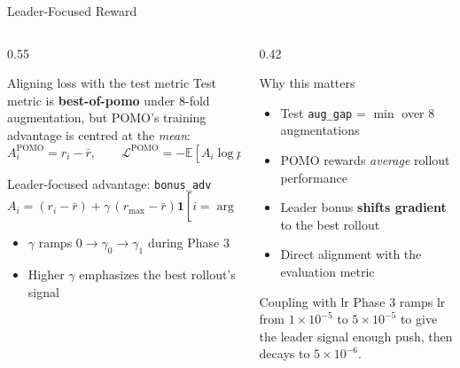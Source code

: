 \documentclass[aspectratio=169,11pt]{beamer}
\newcommand{\tightitems}{%
  \setlength{\itemsep}{1.5pt}%
  \setlength{\parsep}{0pt}%
  \setlength{\topsep}{2pt}%
}
\begin{document}
\begin{frame}[t]{Leader-Focused Reward}
  \small
  \begin{columns}[T,onlytextwidth]
    \begin{column}{0.55\textwidth}
      \begin{block}{Aligning loss with the test metric}
        Test metric is \textbf{best-of-pomo} under 8-fold augmentation,
        but POMO's training advantage is centred at the \emph{mean}:
        \vspace{-0.05cm}
        \[
          A_i^{\text{POMO}} = r_i - \bar{r},
          \qquad
          \mathcal{L}^{\text{POMO}} = -\mathbb{E}\!\left[A_i \log p_i\right]
        \]
      \end{block}
      \begin{block}{Leader-focused advantage: \texttt{bonus\_adv}}
        \vspace{-0.1cm}
        \[
          A_i = (r_i - \bar{r}) + \gamma\,(r_{\max} - \bar{r})
          \mathbf{1}\!\left[i = \arg\max_j r_j\right]
        \]
        \vspace{-0.2cm}
        \begin{itemize}\tightitems
          \item $\gamma$ ramps $0 \!\to\! \gamma_0 \!\to\! \gamma_1$ during Phase 3
          \item Higher $\gamma$ emphasizes the best rollout's signal
        \end{itemize}
      \end{block}
    \end{column}
    \hfill
    \begin{column}{0.42\textwidth}
      \begin{block}{Why this matters}
        \begin{itemize}\tightitems
          \item Test \texttt{aug\_gap} = $\min$ over 8 augmentations
          \item POMO rewards \emph{average} rollout performance
          \item Leader bonus \textbf{shifts gradient} to the best rollout
          \item Direct alignment with the evaluation metric
        \end{itemize}
      \end{block}
      \begin{alertblock}{Coupling with lr}
        \scriptsize
        Phase 3 ramps lr from $1\!\times\!10^{-5}$ to $5\!\times\!10^{-5}$ to give the leader signal enough push, then decays to $5\!\times\!10^{-6}$.
      \end{alertblock}
    \end{column}
  \end{columns}
\end{frame}
\end{document}
